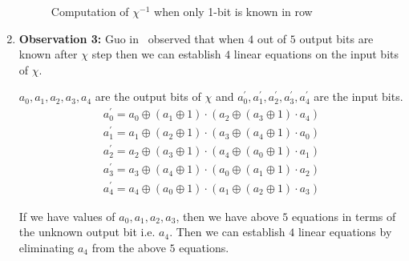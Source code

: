 \begin{enumerate}
\begin{figure}[ht]
\begin{center}
\end{center}
\caption{Computation of $\chi^{-1}$ when only 1-bit is known in row \label{chi_inv2}}
\end{figure}

\item \label{ob3}\textbf{Observation 3:} Guo \etal in~\cite{guo2016linear} observed that when $4$ out of $5$ output bits are known after $\chi$ step then we can establish $4$ linear equations on the input bits of $\chi$.

$a_0, a_1, a_2, a_3, a_4$ are the output bits of $\chi$ and $a_0^\prime, a_1^\prime, a_2^\prime, a_3^\prime, a_4^\prime$ are the input bits.
\begin{align}
a_0^\prime = a_0 \oplus \left( a_{1} \oplus 1\right) \cdot \left( a_{2} \oplus \left( a_{3} \oplus 1 \right) \cdot a_{4}\right)
\end{align}
\begin{align}
a_1^\prime = a_1 \oplus \left( a_{2} \oplus 1\right) \cdot \left( a_{3} \oplus \left( a_{4} \oplus 1 \right) \cdot a_{0}\right)
\end{align}
\begin{align}
a_2^\prime = a_2 \oplus \left( a_{3} \oplus 1\right) \cdot \left( a_{4} \oplus \left( a_{0} \oplus 1 \right) \cdot a_{1}\right)
\end{align}
\begin{align}
a_3^\prime = a_3 \oplus \left( a_{4} \oplus 1\right) \cdot \left( a_{0} \oplus \left( a_{1} \oplus 1 \right) \cdot a_{2}\right)
\end{align}
\begin{align}
a_4^\prime = a_4 \oplus \left( a_{0} \oplus 1\right) \cdot \left( a_{1} \oplus \left( a_{2} \oplus 1 \right) \cdot a_{3}\right)
\end{align}

If we have values of $a_0, a_1, a_2, a_3$, then we have above $5$ equations in terms of the unknown output bit i.e. $a_4$. Then we can establish $4$ linear equations by eliminating $a_4$ from the above $5$ equations.

\end{enumerate}


